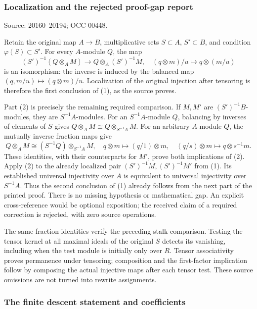 \subsubsection{Localization and the rejected proof-gap report}\label{localization-and-the-rejected-proof-gap-report}

Source: 20160--20194; OCC-00448.

Retain the original map \(A\to B\), multiplicative sets \(S\subset A\), \(S'\subset B\), and condition \(\varphi(S)\subset S'\). For every \(A\)-module \(Q\), the map \[
(S')^{-1}(Q\otimes_AM)\longrightarrow Q\otimes_A(S')^{-1}M,
\quad (q\otimes m)/u\longmapsto q\otimes(m/u)
\] is an isomorphism: the inverse is induced by the balanced map \((q,m/u)\mapsto(q\otimes m)/u\). Localization of the original injection after tensoring is therefore the first conclusion of (1), as the source proves.

Part (2) is precisely the remaining required comparison. If \(M,M'\) are \((S')^{-1}B\)-modules, they are \(S^{-1}A\)-modules. For an \(S^{-1}A\)-module \(Q\), balancing by inverses of elements of \(S\) gives \(Q\otimes_AM\cong Q\otimes_{S^{-1}A}M\). For an arbitrary \(A\)-module \(Q\), the mutually inverse fraction maps give \[
Q\otimes_AM\cong(S^{-1}Q)\otimes_{S^{-1}A}M,
\quad q\otimes m\mapsto(q/1)\otimes m,
\quad(q/s)\otimes m\mapsto q\otimes s^{-1}m.
\] These identities, with their counterparts for \(M'\), prove both implications of (2). Apply (2) to the already localized pair \((S')^{-1}M,(S')^{-1}M'\) from (1). Its established universal injectivity over \(A\) is equivalent to universal injectivity over \(S^{-1}A\). Thus the second conclusion of (1) already follows from the next part of the printed proof. There is no missing hypothesis or mathematical gap. An explicit cross-reference would be optional exposition; the received claim of a required correction is rejected, with zero source operations.

The same fraction identities verify the preceding stalk comparison. Testing the tensor kernel at all maximal ideals of the original \(S\) detects its vanishing, including when the test module is initially only over \(R\). Tensor associativity proves permanence under tensoring; composition and the first-factor implication follow by composing the actual injective maps after each tensor test. These source omissions are not turned into rewrite assignments.

\subsubsection{The finite descent statement and coefficients}\label{the-finite-descent-statement-and-coefficients}

